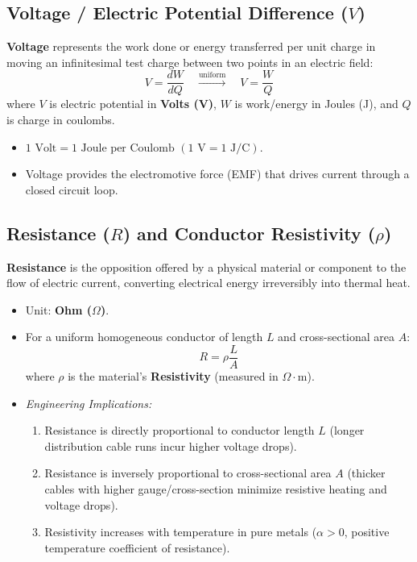 \subsection{Voltage / Electric Potential Difference ($V$)}
\textbf{Voltage} represents the work done or energy transferred per unit charge in moving an infinitesimal test charge between two points in an electric field:
\begin{equation}
\label{eq:voltage_def}
\boxed{V = \frac{dW}{dQ} \quad \xrightarrow{\text{uniform}} \quad V = \frac{W}{Q}}
\end{equation}
where $V$ is electric potential in \textbf{Volts (V)}, $W$ is work/energy in Joules (J), and $Q$ is charge in coulombs.
\begin{itemize}
    \item $1\text{ Volt} = 1\text{ Joule per Coulomb } (1\text{ V} = 1\text{ J/C})$.
    \item Voltage provides the electromotive force (EMF) that drives current through a closed circuit loop.
\end{itemize}

\subsection{Resistance ($R$) and Conductor Resistivity ($\rho$)}
\textbf{Resistance} is the opposition offered by a physical material or component to the flow of electric current, converting electrical energy irreversibly into thermal heat.
\begin{itemize}
    \item Unit: \textbf{Ohm ($\Omega$)}.
    \item For a uniform homogeneous conductor of length $L$ and cross-sectional area $A$:
    \begin{equation}
    \label{eq:resistance_resistivity}
    \boxed{R = \rho \frac{L}{A}}
    \end{equation}
    where $\rho$ is the material's \textbf{Resistivity} (measured in $\Omega\cdot\text{m}$).
    \item \textit{Engineering Implications:}
    \begin{enumerate}[label=\bfseries\alph*.]
        \item Resistance is directly proportional to conductor length $L$ (longer distribution cable runs incur higher voltage drops).
        \item Resistance is inversely proportional to cross-sectional area $A$ (thicker cables with higher gauge/cross-section minimize resistive heating and voltage drops).
        \item Resistivity increases with temperature in pure metals ($\alpha > 0$, positive temperature coefficient of resistance).
    \end{enumerate}
\end{itemize}

